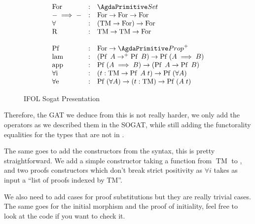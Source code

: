 \documentclass[10pt,a4paper]{article}
\begin{document}
			\begin{figure}
				\begin{tcolorbox}
					\[
					\begin{array}{lcl}
						\For & : & \Set \\
						- \implies - & : & \For \rightarrow \For \rightarrow \For\\
						\forall & : & (\operatorname{TM} \rightarrow \For) \rightarrow \For \\
						\R & : & \operatorname{TM} \rightarrow \operatorname{TM} \rightarrow \For\\
						\\
						\Pf & : & \For \rightarrow \Prop^+ \\
						\lam & : & (\Pf A \rightarrow^+ \Pf B) \rightarrow \Pf (A \implies B)\\
						\app & : & \Pf (A \implies B) \rightarrow (\Pf A \rightarrow \Pf B)\\
						\foralli & : & (t : \operatorname{TM} \rightarrow \Pf A\;t) \rightarrow \Pf (\forall A)\\
						\foralle & : & \Pf (\forall A) \rightarrow (t : \operatorname{TM}) \rightarrow \Pf (A\;t)\\
					\end{array}
					\]
				\end{tcolorbox}
				\caption{IFOL Sogat Presentation}
				\label{fig:ifol-sogat}
			\end{figure}
	
			Therefore, the GAT we deduce from this is not really harder, we only add the operators as we described them in the SOGAT, while still adding the functorality equalities for the types that are not in .
			
			\begin{tcolorbox}
				\agdasep
			\end{tcolorbox}
		
			The same goes to add the constructors from the syntax, this is pretty straightforward. We add a simple constructor taking a function from $\operatorname{TM}$ to , and two proofs constructors which don't break strict positivity as $\forall i$ takes as input a \enquote{list of proofs indexed by TM}.
			
			We also need to add cases for proof substitutions but they are really trivial cases. The same goes for the initial morphism and the proof of initiality, feel free to look at the code if you want to check it.
			
\end{document}
